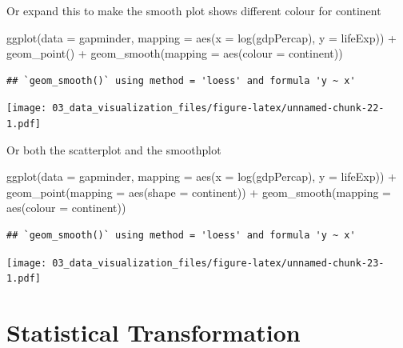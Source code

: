 \documentclass[
  10pt,
]{krantz}
\newenvironment{Shaded}{\begin{snugshade}}{\end{snugshade}}
\newcommand{\AttributeTok}[1]{\textcolor[rgb]{0.77,0.63,0.00}{#1}}
\newcommand{\FunctionTok}[1]{\textcolor[rgb]{0.00,0.00,0.00}{#1}}
\newcommand{\NormalTok}[1]{#1}
\newcommand{\SpecialCharTok}[1]{\textcolor[rgb]{0.00,0.00,0.00}{#1}}
\begin{document}
Or expand this to make the smooth plot shows different colour for continent

\begin{Shaded}
\begin{Highlighting}[]
\FunctionTok{ggplot}\NormalTok{(}\AttributeTok{data =}\NormalTok{ gapminder, }
       \AttributeTok{mapping =} \FunctionTok{aes}\NormalTok{(}\AttributeTok{x =} \FunctionTok{log}\NormalTok{(gdpPercap), }\AttributeTok{y =}\NormalTok{ lifeExp)) }\SpecialCharTok{+}
  \FunctionTok{geom\_point}\NormalTok{() }\SpecialCharTok{+}
  \FunctionTok{geom\_smooth}\NormalTok{(}\AttributeTok{mapping =} \FunctionTok{aes}\NormalTok{(}\AttributeTok{colour =}\NormalTok{ continent))}
\end{Highlighting}
\end{Shaded}

\begin{verbatim}
## `geom_smooth()` using method = 'loess' and formula 'y ~ x'
\end{verbatim}

\texttt{[image: 03\_data\_visualization\_files/figure-latex/unnamed-chunk-22-1.pdf]}

Or both the scatterplot and the smoothplot

\begin{Shaded}
\begin{Highlighting}[]
\FunctionTok{ggplot}\NormalTok{(}\AttributeTok{data =}\NormalTok{ gapminder, }
       \AttributeTok{mapping =} \FunctionTok{aes}\NormalTok{(}\AttributeTok{x =} \FunctionTok{log}\NormalTok{(gdpPercap), }\AttributeTok{y =}\NormalTok{ lifeExp)) }\SpecialCharTok{+}
  \FunctionTok{geom\_point}\NormalTok{(}\AttributeTok{mapping =} \FunctionTok{aes}\NormalTok{(}\AttributeTok{shape =}\NormalTok{ continent)) }\SpecialCharTok{+}
  \FunctionTok{geom\_smooth}\NormalTok{(}\AttributeTok{mapping =} \FunctionTok{aes}\NormalTok{(}\AttributeTok{colour =}\NormalTok{ continent))}
\end{Highlighting}
\end{Shaded}

\begin{verbatim}
## `geom_smooth()` using method = 'loess' and formula 'y ~ x'
\end{verbatim}

\texttt{[image: 03\_data\_visualization\_files/figure-latex/unnamed-chunk-23-1.pdf]}

\hypertarget{statistical-transformation}{%
\section{Statistical Transformation}\label{statistical-transformation}}
\end{document}
